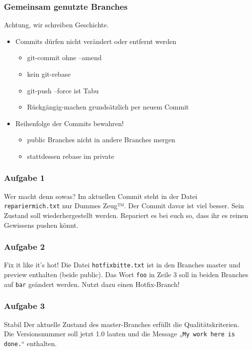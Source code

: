 \documentclass{beamer}
\begin{document}
\begin{frame}
	\frametitle{Gemeinsam genutzte Branches}
	\begin{block}{Achtung, wir schreiben Geschichte.}
		\begin{itemize}
			\item Commits dürfen nicht verändert oder entfernt werden
				\begin{itemize}
					\item git-commit ohne --amend
					\item kein git-rebase
					\item git-push --force ist Tabu
					\item Rückgängig-machen grundsätzlich per neuem Commit
				\end{itemize}
			\item Reihenfolge der Commits bewahren!
				\begin{itemize}
					\item public Branches nicht in andere Branches mergen
					\item stattdessen rebase im private
				\end{itemize}
		\end{itemize}
	\end{block}
\end{frame}

\begin{frame}
	\frametitle{Aufgabe 1}
	\begin{block}{Wer macht denn sowas?}
		Im aktuellen Commit steht in der Datei \texttt{repariermich.txt} nur Dummes Zeug™.
		Der Commit davor ist viel besser.
		Sein Zustand soll wiederhergestellt werden.
		Repariert es bei euch so, dass ihr es reinen Gewissens pushen könnt.
	\end{block}
\end{frame}

\begin{frame}
	\frametitle{Aufgabe 2}
	\begin{block}{Fix it like it’s hot!}
		Die Datei \texttt{hotfixbitte.txt} ist in den Branches master und preview enthalten (beide public).
		Das Wort \texttt{foo} in Zeile 3 soll in beiden Branches auf \texttt{bar} geändert werden.
		Nutzt dazu einen Hotfix-Branch!
	\end{block}
\end{frame}

\begin{frame}
	\frametitle{Aufgabe 3}
	\begin{block}{Stabil}
		Der aktuelle Zustand des master-Branches erfüllt die Qualitätskriterien.
		Die Versionsnummer soll jetzt 1.0 lauten und die Message „\texttt{My work here is done.}“ enthalten.
	\end{block}
\end{frame}
\end{document}
